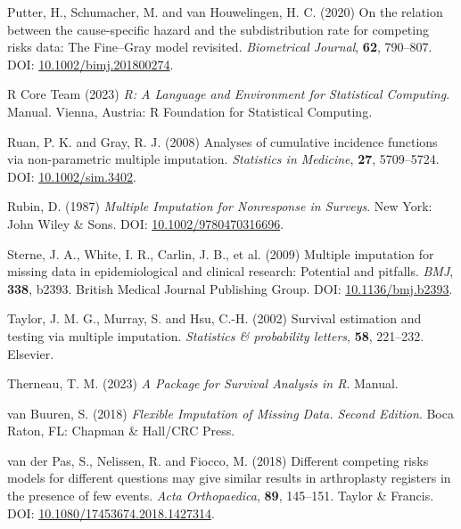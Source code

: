 \documentclass[
  letterpaper,
  DIV=11,
  numbers=noendperiod]{scrreprt}
\newlength{\cslhangindent}
\newlength{\cslentryspacingunit} %
\newenvironment{CSLReferences}[2] %
 {%
  \setlength{\parindent}{0pt}
  \ifodd #1
  \let\oldpar\par
  \def\par{\hangindent=\cslhangindent\oldpar}
  \fi
  \setlength{\parskip}{#2\cslentryspacingunit}
 }%
 {}
\begin{document}
\begin{CSLReferences}{1}{0}
\leavevmode{}%
Putter, H., Schumacher, M. and van Houwelingen, H. C. (2020) On the
relation between the cause-specific hazard and the subdistribution rate
for competing risks data: {The Fine}--{Gray} model revisited.
\emph{Biometrical Journal}, \textbf{62}, 790--807. DOI:
\href{https://doi.org/10.1002/bimj.201800274}{10.1002/bimj.201800274}.

\leavevmode{}%
R Core Team (2023) \emph{R: {A} Language and Environment for Statistical
Computing}. Manual. Vienna, Austria: R Foundation for Statistical
Computing.

\leavevmode{}%
Ruan, P. K. and Gray, R. J. (2008) Analyses of cumulative incidence
functions via non-parametric multiple imputation. \emph{Statistics in
Medicine}, \textbf{27}, 5709--5724. DOI:
\href{https://doi.org/10.1002/sim.3402}{10.1002/sim.3402}.

\leavevmode{}%
Rubin, D. (1987) \emph{Multiple Imputation for Nonresponse in Surveys}.
New York: John Wiley \& Sons. DOI:
\href{https://doi.org/10.1002/9780470316696}{10.1002/9780470316696}.

\leavevmode{}%
Sterne, J. A., White, I. R., Carlin, J. B., et al. (2009) Multiple
imputation for missing data in epidemiological and clinical research:
Potential and pitfalls. \emph{BMJ}, \textbf{338}, b2393. British Medical
Journal Publishing Group. DOI:
\href{https://doi.org/10.1136/bmj.b2393}{10.1136/bmj.b2393}.

\leavevmode{}%
Taylor, J. M. G., Murray, S. and Hsu, C.-H. (2002) Survival estimation
and testing via multiple imputation. \emph{Statistics \& probability
letters}, \textbf{58}, 221--232. Elsevier.

\leavevmode{}%
Therneau, T. M. (2023) \emph{A Package for Survival Analysis in {R}}.
Manual.

\leavevmode{}%
van Buuren, S. (2018) \emph{Flexible Imputation of Missing Data.
{Second} Edition}. Boca Raton, FL: Chapman \& Hall/CRC Press.

\leavevmode{}%
van der Pas, S., Nelissen, R. and Fiocco, M. (2018) Different competing
risks models for different questions may give similar results in
arthroplasty registers in the presence of few events. \emph{Acta
Orthopaedica}, \textbf{89}, 145--151. Taylor \& Francis. DOI:
\href{https://doi.org/10.1080/17453674.2018.1427314}{10.1080/17453674.2018.1427314}.


\end{CSLReferences}
\end{document}
